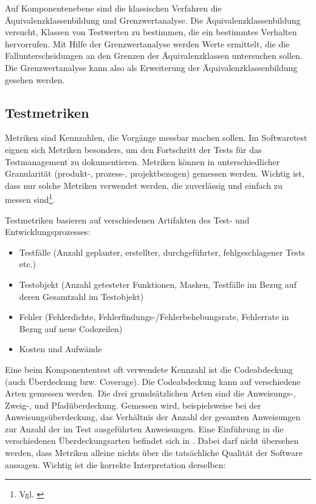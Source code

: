Auf Komponentenebene sind die klassischen Verfahren die Äquivalenzklassenbildung und Grenzwertanalyse. Die Äquivalenzklassenbildung versucht, Klassen von Testwerten zu bestimmen, die ein bestimmtes Verhalten hervorrufen. Mit Hilfe der Grenzwertanalyse werden Werte ermittelt, die die Fallunterscheidungen an den Grenzen der Äquivalenzklassen untersuchen sollen. Die Grenzwertanalyse kann also als Erweiterung der Äquivalenzklassenbildung gesehen werden.

\subsection{Testmetriken}
\label{design_test_metriken}

Metriken sind Kennzahlen, die Vorgänge messbar machen sollen. Im Softwaretest eignen sich Metriken besonders, um den Fortschritt der Tests für das Testmanagement zu dokumentieren. Metriken können in unterschiedlicher Granularität (produkt-, prozess-, projektbezogen) gemessen werden. Wichtig ist, dass nur solche Metriken verwendet werden, die zuverlässig und einfach zu messen sind\footnote{Vgl. \cite{SpLi10}}. 

Testmetriken basieren auf verschiedenen Artifakten des Test- und Entwicklungsprozesses\cite{SpLi06}:

\begin{itemize}
  \item Testfälle (Anzahl geplanter, erstellter, durchgeführter, fehlgeschlagener Tests etc.)
  \item Testobjekt (Anzahl getesteter Funktionen, Masken, Testfälle im Bezug auf deren Gesamtzahl im Testobjekt)
  \item Fehler (Fehlerdichte, Fehlerfindungs-/Fehlerbehebungsrate, Fehlerrate in Bezug auf neue Codezeilen)
  \item Kosten und Aufwände
\end{itemize}

Eine beim Komponententest oft verwendete Kennzahl ist die Codeabdeckung (auch Überdeckung bzw. Coverage). Die Codeabdeckung kann auf verschiedene Arten gemessen werden. Die drei grundsätzlichen Arten sind die Anweisungs-, Zweig-, und Pfadüberdeckung. Gemessen wird, beispielsweise bei der Anweisungsüberdeckung, das Verhältnis der Anzahl der gesamten Anweisungen zur Anzahl der im Test ausgeführten Anweisungen. Eine Einführung in die verschiedenen Überdeckungsarten befindet sich in \cite{Vige10}.
Dabei darf nicht übersehen werden, dass Metriken alleine nichts über die tatsächliche Qualität der Software aussagen. Wichtig ist die korrekte Interpretation derselben:

